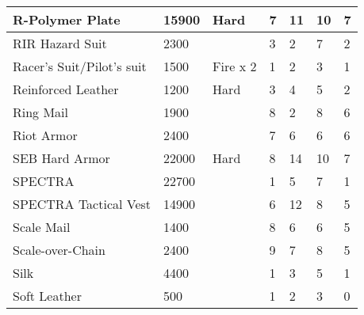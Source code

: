 \documentclass[twoside]{book}
\begin{document}
\begin{longtable}{p{1.25in}llp{2em}p{2em}p{2em}p{2em}}
  \raggedright
           R-Polymer Plate 
  &
   15900 
  &
   Hard 
  &
   7 
  &
   11 
  &
   10 
  &
   7 
  \tabularnewline
  \hline
      
  \raggedright
           RIR Hazard Suit 
  &
   2300 
  &
  
  &
   3 
  &
   2 
  &
   7 
  &
   2 
  \tabularnewline
  \hline
      
  \raggedright
           Racer's Suit/Pilot's
           suit 
  &
   1500 
  &
   Fire x 2 
  &
   1 
  &
   2 
  &
   3 
  &
   1 
  \tabularnewline
  \hline
      
  \raggedright
           Reinforced Leather 
  &
   1200 
  &
   Hard 
  &
   3 
  &
   4 
  &
   5 
  &
   2 
  \tabularnewline
  \hline
      
  \raggedright
           Ring Mail 
  &
   1900 
  &
  
  &
   8 
  &
   2 
  &
   8 
  &
   6 
  \tabularnewline
  \hline
      
  \raggedright
           Riot Armor 
  &
   2400 
  &
  
  &
   7 
  &
   6 
  &
   6 
  &
   6 
  \tabularnewline
  \hline
      
  \raggedright
           SEB Hard Armor 
  &
   22000 
  &
   Hard 
  &
   8 
  &
   14 
  &
   10 
  &
   7 
  \tabularnewline
  \hline
      
  \raggedright
           SPECTRA 
  &
   22700 
  &
  
  &
   1 
  &
   5 
  &
   7 
  &
   1 
  \tabularnewline
  \hline
      
  \raggedright
           SPECTRA Tactical Vest 
  &
   14900 
  &
  
  &
   6 
  &
   12 
  &
   8 
  &
   5 
  \tabularnewline
  \hline
      
  \raggedright
           Scale Mail 
  &
   1400 
  &
  
  &
   8 
  &
   6 
  &
   6 
  &
   5 
  \tabularnewline
  \hline
      
  \raggedright
           Scale-over-Chain 
  &
   2400 
  &
  
  &
   9 
  &
   7 
  &
   8 
  &
   5 
  \tabularnewline
  \hline
      
  \raggedright
           Silk 
  &
   4400 
  &
  
  &
   1 
  &
   3 
  &
   5 
  &
   1 
  \tabularnewline
  \hline
      
  \raggedright
           Soft Leather 
  &
   500 
  &
  
  &
   1 
  &
   2 
  &
   3 
  &
   0 
  \tabularnewline
  \hline
      

\end{longtable}
\end{document}
